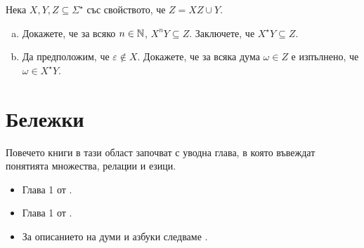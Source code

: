 \begin{problem}
  Нека $X, Y, Z \subseteq \Sigma^\star$ със свойството, че $Z = XZ \cup Y$.
  \begin{enumerate}[a)]
  \item 
    Докажете, че за всяко $n \in \mathbb{N}$, $X^nY \subseteq Z$.
    Заключете, че $X^\star Y \subseteq Z$.
  \item
    Да предположим, че $\varepsilon \not\in X$.
    Докажете, че за всяка дума $\omega \in Z$ е изпълнено, че $\omega \in X^\star Y$.
  \end{enumerate}
\end{problem}

\section*{Бележки}

Повечето книги в тази област започват с уводна глава, в която въвеждат понятията множества, релации и езици.
\begin{itemize}
\item 
  Глава 1 от \cite{rosen}.
\item
  Глава 1 от \cite{papadimitriou}.
\item
  За описанието на думи и азбуки следваме \cite[Глава 2]{kozen}.
\end{itemize}

